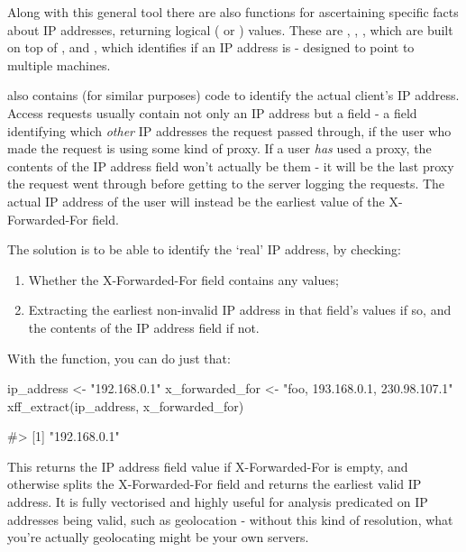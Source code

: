 Along with this general tool there are also functions for ascertaining
specific facts about IP addresses, returning logical ( or
) values. These are , ,
, which are built on top of , and
, which identifies if an IP address is
 - designed to point to multiple machines.

 also contains (for similar purposes) code to identify the
actual client's IP address. Access requests usually contain not only an
IP address but a  field - a field identifying which
\emph{other} IP addresses the request passed through, if the user who
made the request is using some kind of proxy. If a user \emph{has} used
a proxy, the contents of the IP address field won't actually be them -
it will be the last proxy the request went through before getting to the
server logging the requests. The actual IP address of the user will
instead be the earliest value of the X-Forwarded-For field.

The solution is to be able to identify the `real' IP address, by
checking:

\begin{enumerate}
\def\labelenumi{\arabic{enumi}.}
\itemsep1pt\parskip0pt
\item
  Whether the X-Forwarded-For field contains any values;
\item
  Extracting the earliest non-invalid IP address in that field's values
  if so, and the contents of the IP address field if not.
\end{enumerate}

With the  function, you can do just that:

\begin{Schunk}
\begin{Sinput}
ip_address <- "192.168.0.1"
x_forwarded_for <- "foo, 193.168.0.1, 230.98.107.1"
xff_extract(ip_address, x_forwarded_for)
\end{Sinput}
\begin{Soutput}
#> [1] "192.168.0.1"
\end{Soutput}
\end{Schunk}

This returns the IP address field value if X-Forwarded-For is empty, and
otherwise splits the X-Forwarded-For field and returns the earliest
valid IP address. It is fully vectorised and highly useful for analysis
predicated on IP addresses being valid, such as geolocation - without
this kind of resolution, what you're actually geolocating might be your
own servers.

